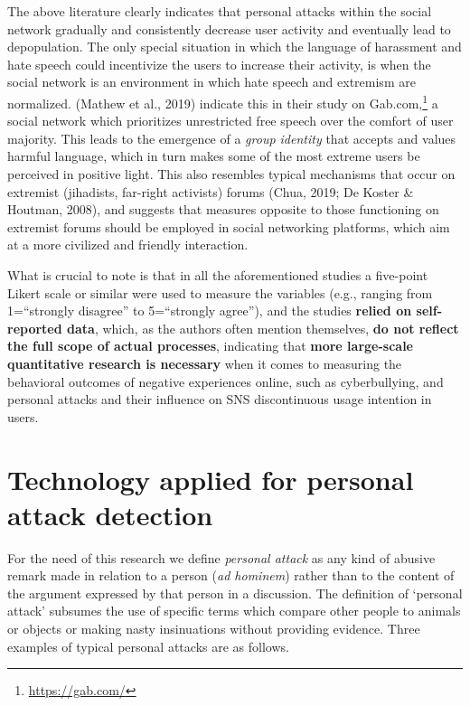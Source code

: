 \documentclass[
  10pt,
  dvipsnames]{scrartcl}
\begin{document}
The above literature clearly indicates that personal attacks within the
social network gradually and consistently decrease user activity and
eventually lead to depopulation. The only special situation in which the
language of harassment and hate speech could incentivize the users to
increase their activity, is when the social network is an environment in
which hate speech and extremism are normalized. (Mathew et al., 2019)
indicate this in their study on
Gab.com,\footnote{\url{https://gab.com/}} a social network which
prioritizes unrestricted free speech over the comfort of user majority.
This leads to the emergence of a \textit{group identity} that accepts
and values harmful language, which in turn makes some of the most
extreme users be perceived in positive light. This also resembles
typical mechanisms that occur on extremist (jihadists, far-right
activists) forums (Chua, 2019; De Koster \& Houtman, 2008), and suggests
that measures opposite to those functioning on extremist forums should
be employed in social networking platforms, which aim at a more
civilized and friendly interaction.

What is crucial to note is that in all the aforementioned studies a
five-point Likert scale or similar were used to measure the variables
(e.g., ranging from 1=``strongly disagree'' to 5=``strongly agree''),
and the studies \textbf{relied on self-reported data}, which, as the
authors often mention themselves,
\textbf{do not reflect the full scope of actual processes}, indicating
that \textbf{more large-scale quantitative research is necessary} when
it comes to measuring the behavioral outcomes of negative experiences
online, such as cyberbullying, and personal attacks and their influence
on SNS discontinuous usage intention in users.

\section{Technology applied for personal attack detection}
\label{technology}

For the need of this research we define \textit{personal attack} as any
kind of abusive remark made in relation to a person
(\textit{ad hominem}) rather than to the content of the argument
expressed by that person in a discussion. The definition of `personal
attack' subsumes the use of specific terms which compare other people to
animals or objects or making nasty insinuations without providing
evidence. Three examples of typical personal attacks are as follows.
\end{document}
